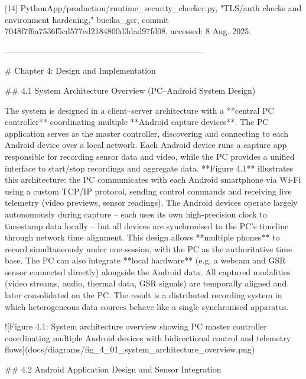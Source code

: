 \documentclass[12pt,a4paper]{article}
\begin{document}
{[14] PythonApp/production/runtime_security_checker.py, "TLS/auth checks and environment hardening," bucika_gsr, commit 7048f7f6a7536f5cd577ed2184800d3dad97fd08, accessed: 8 Aug. 2025.

------------------------------------------------------------------------




\newpage


# Chapter 4: Design and Implementation

## 4.1 System Architecture Overview (PC--Android System Design)

The system is designed in a client--server architecture with a **central
PC controller** coordinating multiple **Android capture devices**. The
PC application serves as the master controller, discovering and
connecting to each Android device over a local network. Each Android
device runs a capture app responsible for recording sensor data and
video, while the PC provides a unified interface to start/stop
recordings and aggregate data. **Figure 4.1** illustrates this
architecture: the PC communicates with each Android smartphone via Wi-Fi
using a custom TCP/IP protocol, sending control commands and receiving
live telemetry (video previews, sensor readings). The Android devices
operate largely autonomously during capture -- each uses its own
high-precision clock to timestamp data locally -- but all devices are
synchronised to the PC's timeline through network time alignment. This
design allows **multiple phones** to record simultaneously under one
session, with the PC as the authoritative time base. The PC can also
integrate **local hardware** (e.g. a webcam and GSR sensor connected
directly) alongside the Android data. All captured modalities (video
streams, audio, thermal data, GSR signals) are temporally aligned and
later consolidated on the PC. The result is a distributed recording
system in which heterogeneous data sources behave like a single
synchronised apparatus.

![Figure 4.1: System architecture overview showing PC master controller coordinating multiple Android devices with bidirectional control and telemetry flows](docs/diagrams/fig_4_01_system_architecture_overview.png)

## 4.2 Android Application Design and Sensor Integration

}
\end{document}
